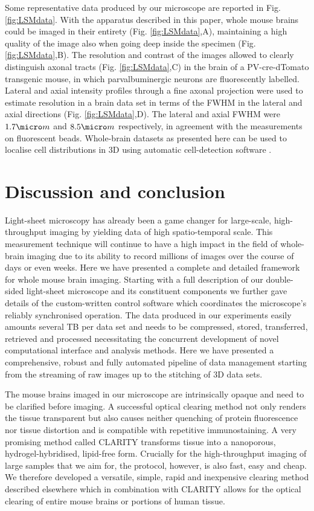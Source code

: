 \documentclass[12pt]{spieman}  %
\begin{document}
\begin{spacing}{2}
Some representative data produced by our microscope are reported in Fig. \ref{fig:LSMdata}. With the apparatus described in this paper, whole mouse brains could be imaged in their entirety (Fig. \ref{fig:LSMdata},A), maintaining a high quality of the image also when going deep inside the specimen (Fig. \ref{fig:LSMdata},B). The resolution and contrast of the images allowed to clearly distinguish axonal tracts (Fig. \ref{fig:LSMdata},C) in the brain of a PV-cre-dTomato transgenic mouse, in which parvalbuminergic neurons are fluorescently labelled. Lateral and axial intensity profiles through a fine axonal projection were used to estimate resolution in a brain data set in terms of the FWHM in the lateral and axial directions (Fig. \ref{fig:LSMdata},D). The lateral and axial FWHM were $1.7 \micro m$ and $8.5 \micro m$ respectively, in agreement with the measurements on fluorescent beads.  Whole-brain datasets as presented here can be used to localise cell distributions in 3D using automatic cell-detection software \cite{Frasconi2014}.

\section{Discussion and conclusion}

Light-sheet microscopy has already been a game changer for large-scale, high-throughput imaging by yielding data of high spatio-temporal scale. This measurement technique will continue to have a high impact in the field of whole-brain imaging due to its ability to record millions of images over the course of days or even weeks. Here we have presented a complete and detailed framework for whole mouse brain imaging. Starting with a full description of our double-sided light-sheet microscope and its constituent components we further gave details of the custom-written control software which coordinates the microscope's reliably synchronised operation. The data produced in our experiments easily amounts several TB per data set and needs to be compressed, stored, transferred, retrieved and processed necessitating the concurrent development of novel computational interface and analysis methods. Here we have presented a comprehensive, robust and fully automated pipeline of data management starting from the streaming of raw images up to the stitching of 3D data sets.

The mouse brains imaged in our microscope are intrinsically opaque and need to be clarified before imaging. A successful optical clearing method not only renders the tissue transparent but also causes neither quenching of protein fluorescence nor tissue distortion and is compatible with repetitive immunostaining. A very promising method called CLARITY\cite{Chung2013,Tomer2014} transforms tissue into a nanoporous, hydrogel-hybridised, lipid-free form. Crucially for the high-throughput imaging of large samples that we aim for, the protocol, however, is also fast, easy and cheap. We therefore developed a versatile, simple, rapid and inexpensive clearing method described elsewhere\cite{Costantini} which in combination with CLARITY allows for the optical clearing of entire mouse brains or portions of human tissue.


\end{spacing}
\end{document}
